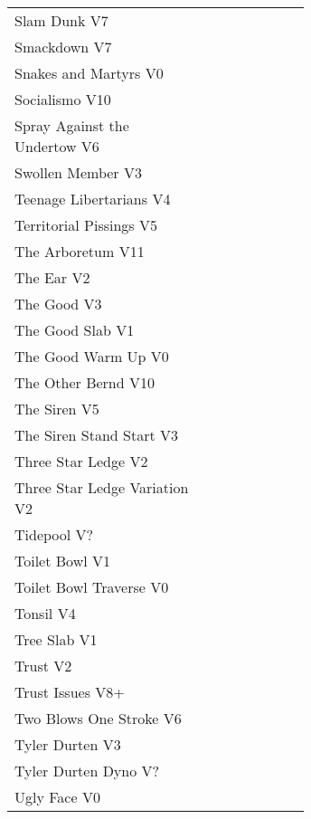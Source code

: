 \begin{center}
\begin{supertabular}{p{0.65\linewidth}r}
Slam Dunk V7 & \pageref{rt:Slam Dunk} \\
Smackdown V7 & \pageref{rt:Smackdown} \\
Snakes and Martyrs V0 & \pageref{rt:Snakes and Martyrs} \\
Socialismo V10 & \pageref{rt:Socialismo} \\
Spray Against the Undertow V6 & \pageref{vr:Spray Against the Undertow} \\
Swollen Member V3 & \pageref{rt:Swollen Member} \\
Teenage Libertarians V4 & \pageref{rt:Teenage Libertarians} \\
Territorial Pissings V5 & \pageref{rt:Territorial Pissings} \\
The Arboretum V11 & \pageref{rt:The Arboretum} \\
The Ear V2 & \pageref{rt:The Ear} \\
The Good V3 & \pageref{rt:The Good} \\
The Good Slab V1 & \pageref{rt:The Good Slab} \\
The Good Warm Up V0 & \pageref{rt:The Good Warm Up} \\
The Other Bernd V10 & \pageref{rt:The Other Bernd} \\
The Siren V5 & \pageref{rt:The Siren} \\
The Siren Stand Start V3 & \pageref{vr:The Siren Stand Start} \\
Three Star Ledge V2 & \pageref{rt:Three Star Ledge} \\
Three Star Ledge Variation V2 & \pageref{vr:Three Star Ledge Variation} \\
Tidepool V? & \pageref{rt:Tidepool} \\
Toilet Bowl V1 & \pageref{rt:Toilet Bowl} \\
Toilet Bowl Traverse V0 & \pageref{rt:Toilet Bowl Traverse} \\
Tonsil V4 & \pageref{rt:Tonsil} \\
Tree Slab V1 & \pageref{rt:Tree Slab} \\
Trust V2 & \pageref{rt:Trust} \\
Trust Issues V8+ & \pageref{rt:Trust Issues} \\
Two Blows One Stroke V6 & \pageref{rt:Two Blows One Stroke} \\
Tyler Durten V3 & \pageref{rt:Tyler Durten} \\
Tyler Durten Dyno V? & \pageref{vr:Tyler Durten Dyno} \\
Ugly Face V0 & \pageref{rt:Ugly Face} \\

\end{supertabular}
\end{center}
